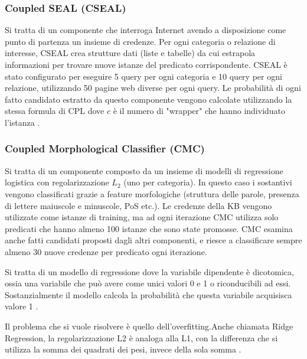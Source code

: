 \subsubsection{Coupled SEAL (CSEAL)}
Si tratta di un componente che interroga Internet avendo a disposizione come punto di partenza  un insieme di credenze. Per ogni categoria o relazione di interesse, CSEAL crea strutture dati (liste e tabelle) da cui estrapola informazioni per trovare nuove istanze del predicato corrispondente. CSEAL è stato configurato per eseguire 5 query per ogni categoria e 10 query per ogni relazione, utilizzando 50 pagine web diverse per ogni query.
Le probabilità di ogni fatto candidato estratto da questo componente vengono calcolate utilizzando la stessa formula di CPL dove $c$ è il numero di "wrapper" che hanno individuato l'istanza \cite{TowardAnArchitecture:online}.
\subsubsection{Coupled Morphological Classifier (CMC)}
Si tratta di un componente composto da un insieme di modelli di regressione logistica con regolarizzazione $L_{2}$ (uno per categoria). In questo caso i sostantivi vengono classificati grazie a feature morfologiche (struttura delle parole, presenza di lettere maiuscole e minuscole, PoS etc.). Le credenze della KB vengono utilizzate come istanze di training, ma ad ogni iterazione CMC utilizza solo predicati che hanno almeno 100 istanze che sono state promosse.
CMC esamina anche fatti candidati proposti dagli altri componenti, e riesce a classificare sempre almeno 30 nuove credenze per predicato ogni iterazione\cite{TowardAnArchitecture:online}.
\begin{info}
Si tratta di un modello di regressione dove la variabile dipendente è dicotomica, ossia una variabile che può avere come unici valori 0 e 1 o riconducibili ad essi. Sostanzialmente il modello calcola la probabilità che questa variabile acquisisca valore 1 \cite{Modellol35:online}.
\end{info}

\begin{info}[Regolarizzazione L2]
	Il problema che si vuole risolvere è quello dell'overfitting.\newline Anche chiamata Ridge Regression, la regolarizzazione L2 è analoga alla L1, con la differenza che si utilizza la somma dei quadrati dei pesi, invece della sola somma \cite{DeepLear11:online}.
\end{info}

\newpage